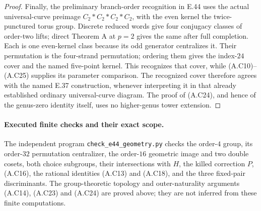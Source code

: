 \begin{proof}
Finally, the preliminary branch-order recognition in E.44
uses the actual universal-curve preimage
$C_2*C_2*C_2*C_2$, with the even kernel the twice-punctured
torus group.  Discrete reduced words give four conjugacy
classes of order-two lifts; direct Theorem A at $p=2$
gives the same after full completion.  Each is one
even-kernel class because its odd generator centralizes
it.  Their permutation is the four-strand permutation;
ordering them gives the index-$24$ cover and the named
five-point kernel.  This recognizes that cover, while
(A.C10)--(A.C25) supplies its parameter comparison.
The recognized cover therefore agrees with the named
E.37 construction, whenever interpreting it in that
already established ordinary universal-curve diagram.
The proof of (A.C24), and hence of the genus-zero
identity itself, uses no higher-genus tower extension.
\end{proof}

\paragraph{Executed finite checks and their exact scope.}
The independent program \texttt{check\_e44\_geometry.py}
checks the order-$4$ group, its order-$32$ permutation
centralizer, the order-$16$ geometric image and two
double cosets, both choice subgroups, their intersections
with $H$, the killed correction $P$, (A.C16), the
rational identities (A.C13) and (A.C18), and the three
fixed-pair discriminants.  The group-theoretic topology
and outer-naturality arguments (A.C14), (A.C23) and
(A.C24) are proved above; they are not inferred from
these finite computations.
